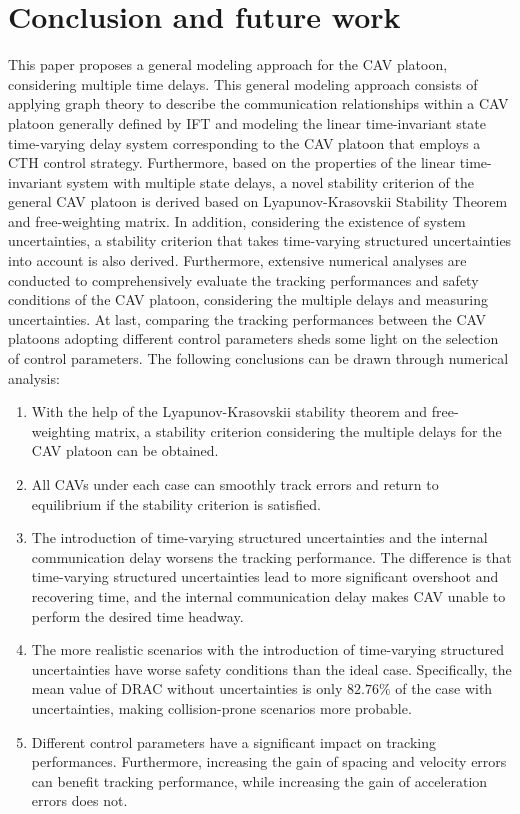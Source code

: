 \documentclass[a4paper]{cas-sc}
\begin{document}
\section{Conclusion and future work}
\label{Section 6}

This paper proposes a general modeling approach for the CAV platoon, considering multiple time delays. This general modeling approach consists of applying graph theory to describe the communication relationships within a CAV platoon generally defined by IFT and modeling the linear time-invariant state time-varying delay system corresponding to the CAV platoon that employs a CTH control strategy. Furthermore, based on the properties of the linear time-invariant system with multiple state delays, a novel stability criterion of the general CAV platoon is derived based on Lyapunov-Krasovskii Stability Theorem and free-weighting matrix. In addition, considering the existence of system uncertainties, a stability criterion that takes time-varying structured uncertainties into account is also derived. Furthermore, extensive numerical analyses are conducted to comprehensively evaluate the tracking performances and safety conditions of the CAV platoon, considering the multiple delays and measuring uncertainties. At last, comparing the tracking performances between the CAV platoons adopting different control parameters sheds some light on the selection of control parameters.
The following conclusions can be drawn through numerical analysis:
\begin{enumerate}

  \item With the help of the Lyapunov-Krasovskii stability theorem and free-weighting matrix, a stability criterion considering the multiple delays for the CAV platoon can be obtained.
  \item All CAVs under each case can smoothly track errors and return to equilibrium if the stability criterion is satisfied.
  \item  The introduction of time-varying structured uncertainties and the internal communication delay worsens the tracking performance. The difference is that time-varying structured uncertainties lead to more significant overshoot and recovering time, and the internal communication delay makes CAV unable to perform the desired time headway.
  \item The more realistic scenarios with the introduction of time-varying structured uncertainties have worse safety conditions than the ideal case. Specifically, the mean value of DRAC without uncertainties is only $82.76\%$ of the case with uncertainties, making collision-prone scenarios more probable.
  \item Different control parameters have a significant impact on tracking performances. Furthermore, increasing the gain of spacing and velocity errors can benefit tracking performance, while increasing the gain of acceleration errors does not.

\end{enumerate}
\end{document}
